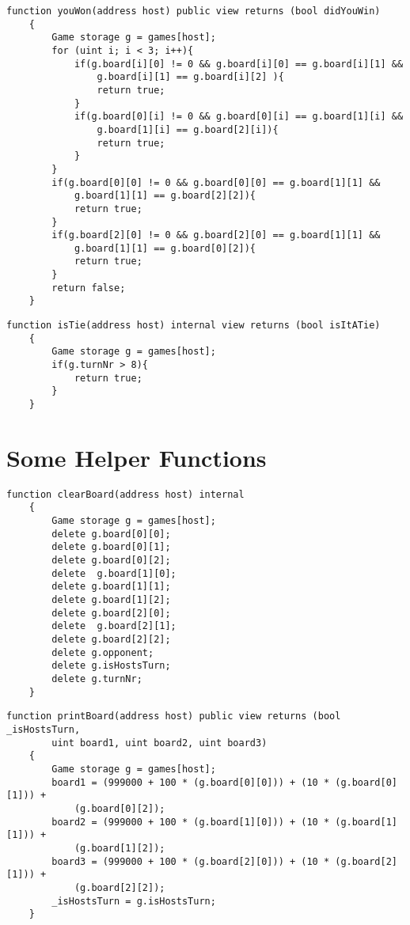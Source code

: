 \documentclass[11pt]{article}
\begin{document}
\begin{Verbatim}[fontsize=\small]
    function youWon(address host) public view returns (bool didYouWin)
    {
        Game storage g = games[host];
        for (uint i; i < 3; i++){
            if(g.board[i][0] != 0 && g.board[i][0] == g.board[i][1] && 
            	g.board[i][1] == g.board[i][2] ){
                return true;
            }
            if(g.board[0][i] != 0 && g.board[0][i] == g.board[1][i] && 
            	g.board[1][i] == g.board[2][i]){
                return true;
            }
        }
        if(g.board[0][0] != 0 && g.board[0][0] == g.board[1][1] && 
        	g.board[1][1] == g.board[2][2]){
            return true;
        }
        if(g.board[2][0] != 0 && g.board[2][0] == g.board[1][1] && 
        	g.board[1][1] == g.board[0][2]){
            return true;
        }
        return false;
    }
\end{Verbatim}

\begin{Verbatim}[fontsize=\small]
    function isTie(address host) internal view returns (bool isItATie)
    {
        Game storage g = games[host];
        if(g.turnNr > 8){
            return true;
        }
    }
\end{Verbatim}

\section{Some Helper Functions}
\begin{Verbatim}[fontsize=\small]
    function clearBoard(address host) internal
    {
        Game storage g = games[host];
        delete g.board[0][0];
        delete g.board[0][1];
        delete g.board[0][2];
        delete  g.board[1][0];
        delete g.board[1][1];
        delete g.board[1][2];
        delete g.board[2][0];
        delete  g.board[2][1];
        delete g.board[2][2];
        delete g.opponent;
        delete g.isHostsTurn;
        delete g.turnNr;
    }
\end{Verbatim}

\begin{Verbatim}[fontsize=\small]
    function printBoard(address host) public view returns (bool _isHostsTurn, 
    	uint board1, uint board2, uint board3)
    {
        Game storage g = games[host];
        board1 = (999000 + 100 * (g.board[0][0])) + (10 * (g.board[0][1])) + 
        	(g.board[0][2]);
        board2 = (999000 + 100 * (g.board[1][0])) + (10 * (g.board[1][1])) + 
        	(g.board[1][2]);
        board3 = (999000 + 100 * (g.board[2][0])) + (10 * (g.board[2][1])) + 
        	(g.board[2][2]);
        _isHostsTurn = g.isHostsTurn;
    }

\end{Verbatim}
\end{document}
